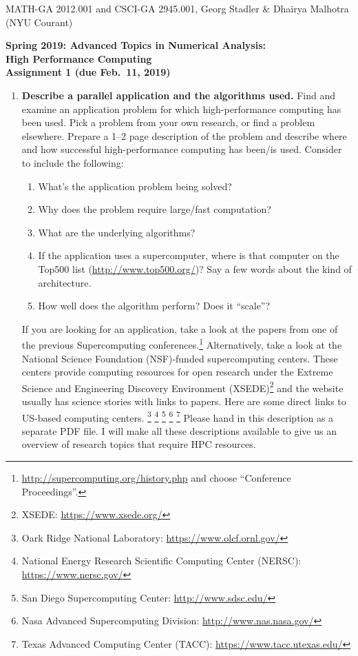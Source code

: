 \documentclass[11pt]{article}
\begin{document}
\begin{center}
  \vspace*{-2cm}
{\small MATH-GA 2012.001 and CSCI-GA 2945.001, Georg Stadler \&
  Dhairya Malhotra (NYU Courant)}
\end{center}
\vspace*{.5cm}
\begin{center}
\large \textbf{%
Spring 2019: Advanced Topics in Numerical Analysis: \\
High Performance Computing \\
Assignment 1 (due Feb.\ 11, 2019) }
\end{center}


\begin{enumerate}
\item {\bf Describe a parallel application and the algorithms used.}
  Find and examine an application problem for which high-performance
  computing has been used. Pick a problem from your own research, or
  find a problem elsewhere. Prepare a 1--2 page description of the
  problem and describe where and how successful high-performance
  computing has been/is used. Consider to include the following:
\begin{enumerate}
\item What's the application problem being solved?
\item Why does the problem require large/fast computation?
\item What are the underlying algorithms?
\item If the application uses a supercomputer, where is that computer
  on the Top500 list (\url{http://www.top500.org/})? Say a few words
  about the kind of architecture.
\item How well does the algorithm perform? Does it ``scale''?
\end{enumerate}
If you are looking for an application, take a look at the papers from
one of the previous Supercomputing
conferences.\footnote{\url{http://supercomputing.org/history.php} and
  choose ``Conference Proceedings''.} Alternatively, take a look at
the National Science Foundation (NSF)-funded supercomputing
centers. These centers provide computing resources for open research
under the Extreme Science and Engineering Discovery Environment
(XSEDE)\footnote{XSEDE: \url{https://www.xsede.org/}} and the website usually has 
science stories with links to papers.
Here are some direct links to US-based computing centers.%
\footnote{Oark Ridge National Laboratory:
  \url{https://www.olcf.ornl.gov/}}%
\footnote{National Energy Research Scientific Computing Center
  (NERSC): \url{https://www.nersc.gov/}}%
\footnote{San Diego Supercomputing Center:
  \url{http://www.sdsc.edu/}}%
\footnote{Nasa Advanced Supercomputing Division:
  \url{http://www.nas.nasa.gov/}}%
\footnote{Texas Advanced Computing Center (TACC):
  \url{https://www.tacc.utexas.edu/}} Please hand in this description
as a separate PDF file. I will make all these descriptions available
to give us an overview of research topics that require HPC resources.


\end{enumerate}
\end{document}
